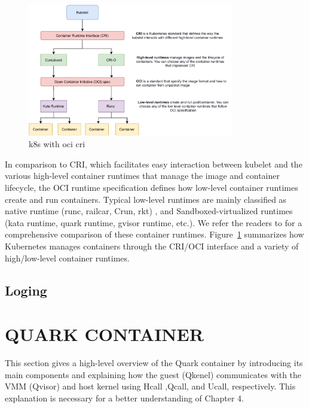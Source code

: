 \begin{figure}[H]
    \centering
    \includegraphics[width=0.8\textwidth]{images/k8s_with_oci_cri.pdf}
    \caption[k8s with oci cri]{k8s with oci cri}
    \label{fig:k8s_with_oci_cri}
\end{figure}
In comparison to CRI, which facilitates easy interaction between kubelet and the various high-level container runtimes that manage the image and container lifecycle, the OCI runtime 
specification\cite*{oci-runtime-spec} defines how low-level container runtimes create and run containers. Typical low-level runtimes are mainly classified as native runtime 
(runc\cite*{runc}, railcar\cite*{railcar}, Crun\cite*{runc}, rkt\cite*{rkt}) , and Sandboxed-virtualized runtimes (kata runtime\cite*{Kata-Containers}, quark runtime\cite*{quark}, gvisor runtime\cite*{gvisor}, etc.). 
We refer the readers to \cite*{Runtime-Comparison} for a comprehensive comparison of these container runtimes. Figure~\ref{fig:k8s_with_oci_cri} summarizes how Kubernetes manages containers through the CRI/OCI interface and a variety of high/low-level container runtimes.

\subsection{Loging}

\section{QUARK CONTAINER}
This section gives a high-level overview of the Quark container\cite*{quark} by introducing its main components and explaining how the guest (Qkenel) communicates with the 
VMM (Qvisor) and host kernel using Hcall ,Qcall, and Ucall, respectively. This explanation is necessary for a better understanding of Chapter 4.

